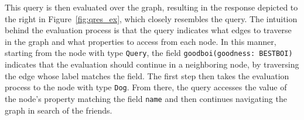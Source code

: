 This query is then evaluated over the graph, resulting in the response depicted to the right in Figure~\ref{fig:qres_ex}, which closely resembles the query.
The intuition behind the evaluation process is that the query indicates what edges to traverse in the graph and what properties to access from 
each node. In this manner, starting from the node with type \texttt{Query}, the field \texttt{goodboi(goodness: BESTBOI)} indicates that the evaluation should continue 
in a neighboring node, by traversing the edge whose label matches the field. The first step then takes the evaluation process to the node with type \texttt{Dog}.
From there, the query accesses the value of the node's property matching the field \texttt{name} and then continues navigating the graph in search of the
friends.





